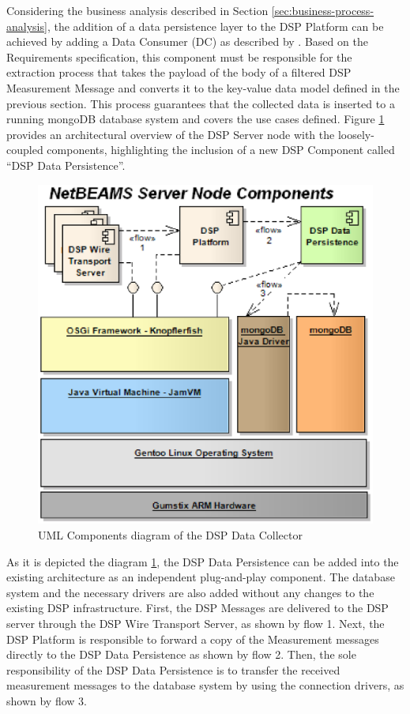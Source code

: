 Considering the business analysis described in Section
\ref{sec:business-process-analysis}, the addition of a data persistence layer
to the DSP Platform can be achieved by adding a Data Consumer (DC) as 
described by \cite{netbeams-dsp-architecture}. Based on the 
Requirements specification, this component must be responsible for the 
extraction process that takes the payload of the body of a filtered DSP
Measurement Message and converts it to the key-value data model defined
in the previous section. This process guarantees that the collected data is
inserted to a running mongoDB database system and covers the use cases
defined. Figure \ref{fig:NetBEAMS-Persistence-Server-Node-Components}
provides an architectural overview of the DSP Server node with the
loosely-coupled components, highlighting the inclusion of a new DSP Component
called ``DSP Data Persistence''.

\begin{figure}[!h]
  \centering
  \includegraphics[scale=0.65]{../diagrams/NetBEAMS-Persistence-Server-Node-Components}
  \caption{UML Components diagram of the DSP Data Collector}
  \label{fig:NetBEAMS-Persistence-Server-Node-Components}
\end{figure}

As it is depicted the diagram 
\ref{fig:NetBEAMS-Persistence-Server-Node-Components}, the DSP Data
Persistence can be added into the existing architecture as an 
independent plug-and-play component. The database system and the necessary
drivers are also added without any changes to the existing DSP 
infrastructure. First, the DSP Messages are delivered to the DSP server 
through the DSP Wire Transport Server, as shown by flow 1. Next, the DSP 
Platform is responsible to forward a copy of the Measurement messages 
directly to the DSP Data Persistence as shown by flow 2. Then, the sole 
responsibility of the DSP Data Persistence is to transfer the received 
measurement messages to the database system by using the connection 
drivers, as shown by flow 3.

